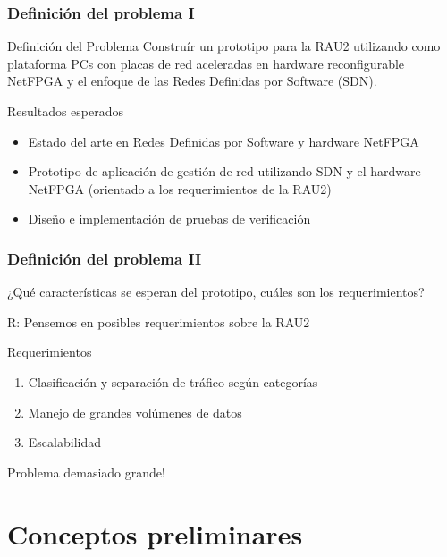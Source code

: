\documentclass{beamer}
\begin{document}
\begin{frame}
\frametitle{Definición del problema I} 

\begin{block}{Definición del Problema }
Constru\'ir un prototipo para la RAU2 utilizando como plataforma PCs con placas de red aceleradas en hardware reconfigurable NetFPGA y el enfoque de las Redes Definidas por Software (SDN).
\end{block}

\pause
\begin{block}{Resultados esperados}
\begin{itemize}
\item Estado del arte en Redes Definidas por Software y hardware NetFPGA
\pause
\item Prototipo de aplicaci\'on de gesti\'on de red utilizando SDN y el hardware NetFPGA (orientado a  los requerimientos de la RAU2)
\pause
\item Diseño e implementaci\'on de pruebas de verificaci\'on
\end{itemize}
\end{block}

\end{frame}

\begin{frame}
\frametitle{Definición del problema II} 

¿Qu\'e características se esperan del prototipo, cu\'ales son los requerimientos?

\pause
{\color{blue}R: Pensemos en posibles requerimientos sobre la RAU2}

\pause
\begin{block}{Requerimientos}
\begin{enumerate}[<+->]
\item Clasificaci\'on y separaci\'on de tr\'afico seg\'un categorías
\item Manejo de grandes vol\'umenes de datos
\item Escalabilidad
\end{enumerate}
\end{block}

\pause
Problema demasiado grande!

\end{frame}


\section{Conceptos preliminares} 
\frame{\tableofcontents[currentsection]}
\end{document}
